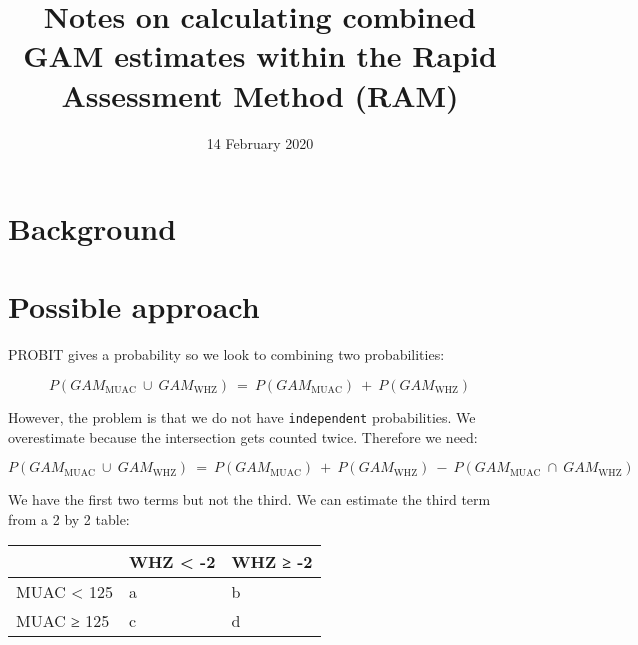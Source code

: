 \documentclass[12pt,a4paper]{article}
\title{Notes on calculating combined GAM estimates within the Rapid Assessment Method (RAM)}
\author{}
\date{\vspace{-2.5em}14 February 2020}
\begin{document}
\maketitle

\pagebreak 


{
\hypersetup{linkcolor=}
\setcounter{tocdepth}{3}
\tableofcontents
}
\newpage

\hypertarget{background}{%
\section{Background}\label{background}}

\hypertarget{possible-approach}{%
\section{Possible approach}\label{possible-approach}}

PROBIT gives a probability so we look to combining two probabilities:

\[ P(GAM_{\text{MUAC}} ~ \cup ~ GAM_{\text{WHZ}}) ~ = ~ P(GAM_{\text{MUAC}}) ~ + ~ P(GAM_{\text{WHZ}}) \]

However, the problem is that we do not have \texttt{independent} probabilities. We overestimate because the intersection gets counted twice. Therefore we need:

\[ P(GAM_{\text{MUAC}} ~ \cup ~ GAM_{\text{WHZ}}) ~ = ~ P(GAM_{\text{MUAC}}) ~ + ~ P(GAM_{\text{WHZ}}) ~ - ~ P(GAM_{\text{MUAC}} ~ \cap ~ GAM_{\text{WHZ}}) \]

We have the first two terms but not the third. We can estimate the third term from a 2 by 2 table:

\begin{table}[H]
\centering
\begin{tabular}{l|l|l}
\hline
  & WHZ < -2 & WHZ ≥ -2\\
\hline
\rowcolor{gray!6}  MUAC < 125 & a & b\\
\hline
MUAC ≥ 125 & c & d\\
\hline
\end{tabular}
\end{table}


\end{document}
